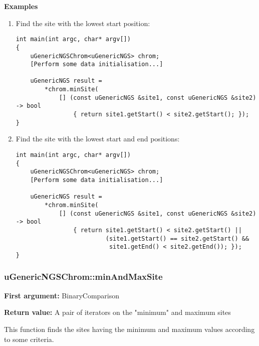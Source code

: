 \documentclass[letterpaper,10pt]{article}
\begin{document}
\bigskip
\noindent{}\textbf{Examples}
\begin{enumerate}
 \item Find the site with the lowest start position:
\begin{verbatim}
int main(int argc, char* argv[])
{
    uGenericNGSChrom<uGenericNGS> chrom;
    [Perform some data initialisation...]

    uGenericNGS result = 
        *chrom.minSite(
            [] (const uGenericNGS &site1, const uGenericNGS &site2) -> bool
                { return site1.getStart() < site2.getStart(); });
}
\end{verbatim}

 \item Find the site with the lowest start and end positions:
\begin{verbatim}
int main(int argc, char* argv[])
{
    uGenericNGSChrom<uGenericNGS> chrom;
    [Perform some data initialisation...]

    uGenericNGS result = 
        *chrom.minSite(
            [] (const uGenericNGS &site1, const uGenericNGS &site2) -> bool
                { return site1.getStart() < site2.getStart() || 
                         (site1.getStart() == site2.getStart() && 
                          site1.getEnd() < site2.getEnd()); });
}
\end{verbatim}
\end{enumerate}

\subsubsection{uGenericNGSChrom::minAndMaxSite}
\textbf{First argument:} BinaryComparison

\noindent{}\textbf{Return value:} A pair of iterators on the "minimum" and maximum sites

\bigskip
\noindent{}This function finds the sites having the minimum and maximum values according to some criteria.
\end{document}
